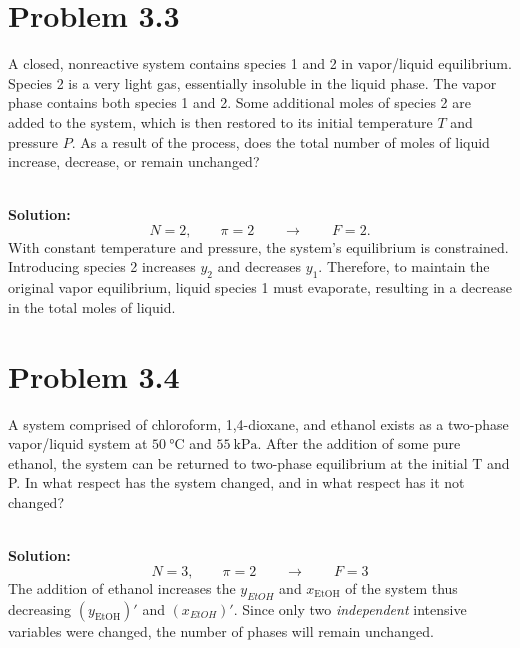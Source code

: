 \documentclass{article}
\newenvironment{solution}{\par\noindent\textbf{\\Solution:\\}}{\par\medskip}
\begin{document}
\section*{Problem 3.3}
A closed, nonreactive system contains species 1 and 2 in vapor/liquid
equilibrium. Species 2 is a very light gas, essentially insoluble in
the liquid phase. The vapor phase contains both species 1 and 2. Some
additional moles of species 2 are added to the system, which is then
restored to its initial temperature \( T \) and pressure \( P \). As
a result of the process, does the total number of moles of liquid
increase, decrease, or remain unchanged?

\begin{solution}
  \begin{equation*}
    N=2, \qquad \pi=2 \qquad \to \qquad F=2.
  \end{equation*}
  With constant temperature and pressure, the system's equilibrium is
  constrained. Introducing species 2 increases $y_2$ and decreases
  $y_1$. Therefore, to maintain the original vapor equilibrium,
  liquid species 1 must evaporate, resulting in a decrease in the
  total moles of liquid.
\end{solution}

\section*{Problem 3.4}
A system comprised of chloroform, 1,4-dioxane, and ethanol exists as
a two-phase vapor/liquid system at $50~\unit{ \degreeCelsius }$ and
$55~\unit{ \kilo\pascal }$. After the addition of some pure ethanol,
the system can be returned to two-phase equilibrium at the initial T
and P. In what respect has the system changed, and in what respect
has it not changed?

\begin{solution}
  \begin{equation*}
    N=3, \qquad \pi=2 \qquad \to \qquad F=3
  \end{equation*}
  The addition of ethanol increases the $y_{EtOH}$ and
  $x_{\text{EtOH}}$ of the system thus decreasing $\left(
  y_{\text{EtOH}} \right)'$ and $\left( x_{EtOH} \right)'$. Since
  only two \textit{independent} intensive variables were changed, the
  number of phases will remain unchanged.
\end{solution}
\end{document}
